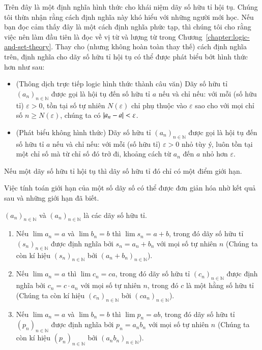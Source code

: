 Trên đây là một định nghĩa hình thức cho khái niệm dãy số hữu tỉ hội tụ. Chúng tôi thừa nhận rằng cách định nghĩa này khó hiểu với những người mới học. Nếu bạn đọc cảm thấy đây là một cách định nghĩa phức tạp, thì chúng tôi cho rằng việc nên làm đầu tiên là đọc về vị từ và lượng từ trong Chương~\ref{chapter:logic-and-set-theory}. Thay cho (nhưng không hoàn toàn thay thế) cách định nghĩa trên, định nghĩa cho dãy số hữu tỉ hội tụ có thể được phát biểu bớt hình thức hơn như sau:
\begin{itemize}
    \item (Thông dịch trực tiếp logic hình thức thành câu văn) Dãy số hữu tỉ ${(a_{n})}_{n\in\mathbb{N}}$ được gọi là hội tụ đến số hữu tỉ $a$ nếu và chỉ nếu: với mỗi (số hữu tỉ) $\varepsilon > 0$, tồn tại số tự nhiên $N(\varepsilon)$ chỉ phụ thuộc vào $\varepsilon$ sao cho với mọi chỉ số $n\geq N(\varepsilon)$, chúng ta có $\left\vert{a_{n} - a}\right\vert < \varepsilon$.
    \item (Phát biểu không hình thức) Dãy số hữu tỉ ${(a_{n})}_{n\in\mathbb{N}}$ được gọi là hội tụ đến số hữu tỉ $a$ nếu và chỉ nếu: với mỗi (số hữu tỉ) $\varepsilon > 0$ nhỏ tùy ý, luôn tồn tại một chỉ số mà từ chỉ số đó trở đi, khoảng cách từ $a_{n}$ đến $a$ nhỏ hơn $\varepsilon$.
\end{itemize}

\begin{theorem}\label{theorem:uniqueness-of-limit-points-of-convergence-rational-sequences}
    Nếu một dãy số hữu tỉ hội tụ thì dãy số hữu tỉ đó chỉ có một điểm giới hạn.
\end{theorem}

Việc tính toán giới hạn của một số dãy số có thể được đơn giản hóa nhờ kết quả sau và những giới hạn đã biết.
\begin{proposition}\label{proposition:limits-of-sum-and-product}
    ${(a_{n})}_{n\in\mathbb{N}}$ và ${(a_{n})}_{n\in\mathbb{N}}$ là các dãy số hữu tỉ.
    \begin{enumerate}[label={(\roman*)}]
        \item Nếu $\lim a_{n} = a$ và $\lim b_{n} = b$ thì $\lim s_{n} = a + b$, trong đó dãy số hữu tỉ ${(s_{n})}_{n\in\mathbb{N}}$ được định nghĩa bởi $s_{n} = a_{n} + b_{n}$ với mọi số tự nhiên $n$ (Chúng ta còn kí hiệu ${(s_{n})}_{n\in\mathbb{N}}$ bởi ${(a_{n} + b_{n})}_{n\in\mathbb{N}}$).
        \item Nếu $\lim a_{n} = a$ thì $\lim c_{n} = ca$, trong đó dãy số hữu tỉ ${(c_{n})}_{n\in\mathbb{N}}$ được định nghĩa bởi $c_{n} = c\cdot a_{n}$ với mọi số tự nhiên $n$, trong đó $c$ là một hằng số hữu tỉ (Chúng ta còn kí hiệu ${(c_{n})}_{n\in\mathbb{N}}$ bởi ${(ca_{n})}_{n\in\mathbb{N}}$).
        \item Nếu $\lim a_{n} = a$ và $\lim b_{n} = b$ thì $\lim p_{n} = ab$, trong đó dãy số hữu tỉ ${(p_{n})}_{n\in\mathbb{N}}$ được định nghĩa bởi $p_{n} = a_{n}b_{n}$ với mọi số tự nhiên $n$ (Chúng ta còn kí hiệu ${(p_{n})}_{n\in\mathbb{N}}$ bởi ${(a_{n}b_{n})}_{n\in\mathbb{N}}$).
    \end{enumerate}
\end{proposition}


